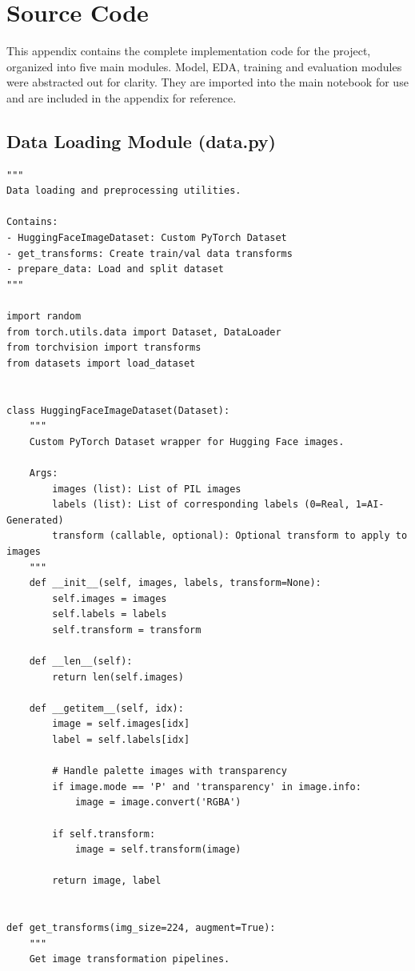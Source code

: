 \documentclass[man,12pt,letterpaper,donotrepeattitle,floatsintext]{apa7}
\begin{document}
\section{Source Code}

This appendix contains the complete implementation code for the project, organized into five main modules.
Model, EDA, training and evaluation modules were abstracted out for clarity. They are imported into the main notebook for use and are included in the appendix for reference.

\subsection{Data Loading Module (data.py)}

\begin{lstlisting}[style=pythonstyle]
"""
Data loading and preprocessing utilities.

Contains:
- HuggingFaceImageDataset: Custom PyTorch Dataset
- get_transforms: Create train/val data transforms
- prepare_data: Load and split dataset
"""

import random
from torch.utils.data import Dataset, DataLoader
from torchvision import transforms
from datasets import load_dataset


class HuggingFaceImageDataset(Dataset):
    """
    Custom PyTorch Dataset wrapper for Hugging Face images.
    
    Args:
        images (list): List of PIL images
        labels (list): List of corresponding labels (0=Real, 1=AI-Generated)
        transform (callable, optional): Optional transform to apply to images
    """
    def __init__(self, images, labels, transform=None):
        self.images = images
        self.labels = labels
        self.transform = transform
    
    def __len__(self):
        return len(self.images)
    
    def __getitem__(self, idx):
        image = self.images[idx]
        label = self.labels[idx]
        
        # Handle palette images with transparency
        if image.mode == 'P' and 'transparency' in image.info:
            image = image.convert('RGBA')
        
        if self.transform:
            image = self.transform(image)
        
        return image, label


def get_transforms(img_size=224, augment=True):
    """
    Get image transformation pipelines.
    

\end{lstlisting}
\end{document}
